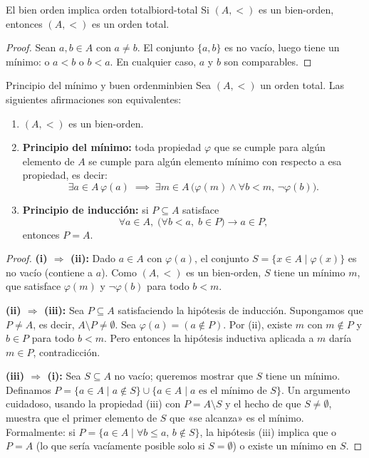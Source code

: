 \begin{proposicion}{El bien orden implica orden total}{biord-total}
Si $(A, <)$ es un bien-orden, entonces $(A, <)$ es un orden total.
\end{proposicion}

\begin{proof}
Sean $a, b \in A$ con $a \neq b$. El conjunto $\{a, b\}$ es no vacío, luego tiene un mínimo: o $a < b$ o $b < a$. En cualquier caso, $a$ y $b$ son comparables.
\end{proof}

\begin{teorema}{Principio del mínimo y buen orden}{minbien}
Sea $(A, <)$ un orden total. Las siguientes afirmaciones son equivalentes:
\begin{enumerate}[leftmargin=2em, label=(\roman*)]
  \item $(A, <)$ es un bien-orden.
  \item \textbf{Principio del mínimo:} toda propiedad $\varphi$ que se cumple para algún elemento de $A$ se cumple para algún elemento mínimo con respecto a esa propiedad, es decir:
  \[
    \exists a \in A\,\varphi(a) \;\implies\; \exists m \in A\,\bigl(\varphi(m) \wedge \forall b < m,\, \neg\varphi(b)\bigr).
  \]
  \item \textbf{Principio de inducción:} si $P \subseteq A$ satisface
  \[
    \forall a \in A,\; \bigl(\forall b < a,\; b \in P\bigr) \to a \in P,
  \]
  entonces $P = A$.
\end{enumerate}
\end{teorema}

\begin{proof}
\textbf{(i) $\Rightarrow$ (ii):} Dado $a \in A$ con $\varphi(a)$, el conjunto $S = \{x \in A \mid \varphi(x)\}$ es no vacío (contiene a $a$). Como $(A,<)$ es un bien-orden, $S$ tiene un mínimo $m$, que satisface $\varphi(m)$ y $\neg\varphi(b)$ para todo $b < m$.

\textbf{(ii) $\Rightarrow$ (iii):} Sea $P \subseteq A$ satisfaciendo la hipótesis de inducción. Supongamos que $P \neq A$, es decir, $A \setminus P \neq \emptyset$. Sea $\varphi(a) = (a \notin P)$. Por (ii), existe $m$ con $m \notin P$ y $b \in P$ para todo $b < m$. Pero entonces la hipótesis inductiva aplicada a $m$ daría $m \in P$, contradicción.

\textbf{(iii) $\Rightarrow$ (i):} Sea $S \subseteq A$ no vacío; queremos mostrar que $S$ tiene un mínimo. Definamos $P = \{a \in A \mid a \notin S\} \cup \{a \in A \mid a \text{ es el mínimo de } S\}$. Un argumento cuidadoso, usando la propiedad (iii) con $P = A \setminus S$ y el hecho de que $S \neq \emptyset$, muestra que el primer elemento de $S$ que «se alcanza» es el mínimo. Formalmente: si $P = \{a \in A \mid \forall b \leq a,\, b \notin S\}$, la hipótesis (iii) implica que o $P = A$ (lo que sería vacíamente posible solo si $S = \emptyset$) o existe un mínimo en $S$.
\end{proof}

